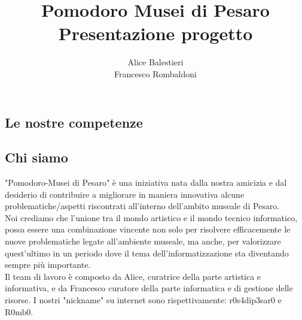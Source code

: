 \documentclass[hidelinks,12pt,a4paper]{article}
\begin{document}
	\begin{flushleft}
		
		\title{\textbf{Pomodoro Musei di Pesaro}\\\small{Presentazione progetto}}
		\author{Alice Balestieri\\ Francesco Rombaldoni}
		\date{}
		
		\maketitle
		
		\setcounter{page}{1}
		\newpage
		\tableofcontents
		\newpage
			
			
			\section{Le nostre competenze}
				\subsection{Chi siamo}
				"Pomodoro-Musei di Pesaro" è una iniziativa nata dalla nostra amicizia e dal desiderio di contribuire a migliorare in maniera innovativa alcune problematiche/aspetti riscontrati all'interno dell'ambito museale di Pesaro.\\
				Noi crediamo che l'unione tra il mondo artistico e il mondo tecnico informatico, possa essere una combinazione vincente non solo per risolvere efficacemente le nuove problematiche legate all'ambiente museale, ma anche, per valorizzare quest'ultimo in un periodo dove il tema dell'informatizzazione sta diventando sempre più importante.\\
				Il team di lavoro è composto da Alice, curatrice della parte artistica e informativa, e da Francesco curatore della parte informatica e di gestione delle risorse. I nostri "nickname" su internet sono rispettivamente: r0s4dip3sar0 e R0mb0. 
				

\end{flushleft}
\end{document}
